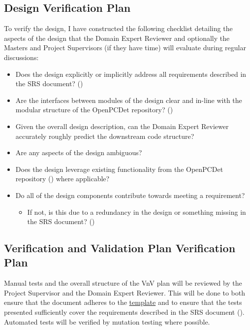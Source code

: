 \documentclass[12pt, titlepage]{article}
\begin{document}
\subsection{Design Verification Plan}

To verify the design, I have constructed the following checklist detailing the aspects of the design
that the Domain Expert Reviewer and optionally the Masters and Project Supervisors (if they have time) 
will evaluate during regular discussions:
\begin{itemize}
  \item Does the design explicitly or implicitly address all requirements described in the SRS document? (\cite{SRS})
  \item Are the interfaces between modules of the design clear and in-line with the modular structure of the OpenPCDet repository? (\cite{openpcdet2020})
  \item Given the overall design description, can the Domain Expert Reviewer accurately roughly predict the downstream code structure?
  \item Are any aspects of the design ambiguous?
  \item Does the design leverage existing functionality from the OpenPCDet repository (\cite{openpcdet2020}) where applicable?
  \item Do all of the design components contribute towards meeting a requirement?
  \begin{itemize}
    \item If not, is this due to a redundancy in the design or something missing in the SRS document? (\cite{SRS})
  \end{itemize}
\end{itemize}

\subsection{Verification and Validation Plan Verification Plan}

Manual tests and the overall structure of the VnV plan will be reviewed by the Project Supervisor
and the Domain Expert Reviewer. This will be done to both ensure that the document adheres to the
\href{https://github.com/alaapgrandhi/equivariant-sensor-fusion/blob/main/docs/Checklists/VnV-Checklist.pdf}{template} and to ensure that the tests presented sufficiently cover the requirements described in
the SRS document (\cite{SRS}). Automated tests will be verified by mutation testing where possible.
\end{document}
